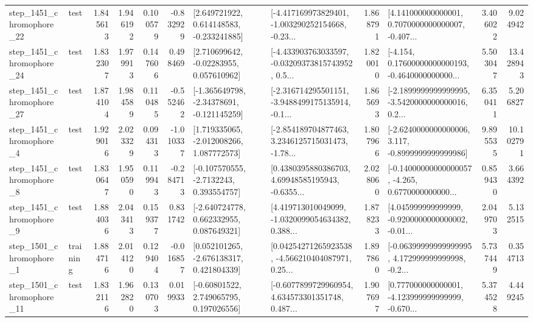 \begin{tabular}{llrrrrllrlrr}
 step\_1451\_chromophore\_22 &      test &      1.845613 &    1.946192 &      0.100579 & -0.832929 &    [2.649721922, 0.614148583, -0.233241885] &  [-4.417169973829401, -1.003290252154668, -0.23... &       1.868791 &  [4.141000000000001, 0.7070000000000007, -0.407... &            3.406022 &          9.024942 \\
 step\_1451\_chromophore\_24 &      test &      1.832307 &    1.979913 &      0.147606 &  0.498469 &     [2.710699642, -0.02283955, 0.057610962] &  [-4.433903763033597, -0.03209373815743952, 0.5... &       1.820010 &  [-4.154, 0.17600000000000193, -0.4640000000000... &            5.503047 &         13.428943 \\
 step\_1451\_chromophore\_27 &      test &      1.874104 &    1.984589 &      0.110485 & -0.552462 &   [-1.365649798, -2.34378691, -0.121145259] &  [-2.316714295501151, -3.9488499175135914, -0.1... &       1.865693 &  [-2.1899999999999995, -3.5420000000000016, 0.2... &            6.350411 &          5.206827 \\
  step\_1451\_chromophore\_4 &      test &      1.929016 &    2.023329 &      0.094313 & -1.010337 &    [1.719335065, -2.012008266, 1.087772573] &  [-2.854189704877463, 3.2346125715031473, -1.78... &       1.807966 &  [-2.6240000000000006, 3.117, -0.8999999999999986] &            9.895535 &         10.102791 \\
  step\_1451\_chromophore\_8 &      test &      1.830647 &    1.950590 &      0.119943 & -0.284713 &     [-0.107570555, -2.7132243, 0.393554757] &  [0.4380395880386703, 4.69948585195943, -0.6355... &       2.028060 &  [-0.14000000000000057, -4.265, 0.6770000000000... &            0.859430 &          3.664392 \\
  step\_1451\_chromophore\_9 &      test &      1.884036 &    2.043413 &      0.159377 &  0.831742 &    [-2.640724778, 0.662332955, 0.087649321] &  [4.419713010049099, -1.0320099054634382, 0.388... &       1.878233 &  [4.045999999999999, -0.9200000000000002, -0.01... &            2.049703 &          5.132515 \\
  step\_1501\_chromophore\_1 &  training &      1.884716 &    2.014120 &      0.129404 & -0.016857 &    [0.052101265, -2.676138317, 0.421804339] &  [0.04254271265923538, -4.566210404087971, 0.25... &       1.897860 &  [-0.06399999999999995, 4.172999999999998, -0.2... &            5.737449 &          0.354713 \\
 step\_1501\_chromophore\_11 &      test &      1.832116 &    1.962820 &      0.130703 &  0.019933 &     [-0.60801522, 2.749065795, 0.197026556] &  [-0.6077899729960954, 4.634573301351748, 0.487... &       1.907697 &  [0.777000000000001, -4.123999999999999, -0.670... &            5.374528 &          4.449245 \\

\end{tabular}
